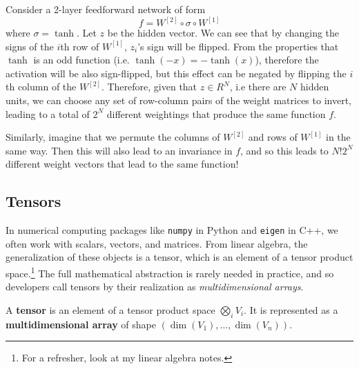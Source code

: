   \begin{theorem}
    Consider a 2-layer feedforward network of form 
    \begin{equation}
      f = W^{[2]} \circ \sigma \circ W^{[1]}
    \end{equation} 
    where $\sigma = \tanh$. Let $z$ be the hidden vector. We can see that by changing the signs of the $i$th row of $W^{[1]}$, $z_i$'s sign will be flipped. From the properties that $\tanh$ is an odd function (i.e. $\tanh(-x) = - \tanh(x)$), therefore the activation will be also sign-flipped, but this effect can be negated by flipping the $i$th column of the $W^{[2]}$. Therefore, given that $z \in R^{N}$, i.e there are $N$ hidden units, we can choose any set of row-column pairs of the weight matrices to invert, leading to a total of $2^N$ different weightings that produce the same function $f$. 

    Similarly, imagine that we permute the columns of $W^{[2]}$ and rows of $W^{[1]}$ in the same way. Then this will also lead to an invariance in $f$, and so this leads to $N! 2^N$ different weight vectors that lead to the same function! 
  \end{theorem}

\subsection{Tensors} 

  In numerical computing packages like \texttt{numpy} in Python and \texttt{eigen} in C++, we often work with scalars, vectors, and matrices. From linear algebra, the generalization of these objects is a tensor, which is an element of a tensor product space.\footnote{For a refresher, look at my linear algebra notes.} The full mathematical abstraction is rarely needed in practice, and so developers call tensors by their realization as \textit{multidimensional arrays}. 
  
  \begin{definition}[Tensor]
    A \textbf{tensor} is an element of a tensor product space $\bigotimes_i V_i$. It is represented as a \textbf{multidimensional array} of shape $(\dim(V_1), \ldots, \dim(V_n))$. 
  \end{definition}

